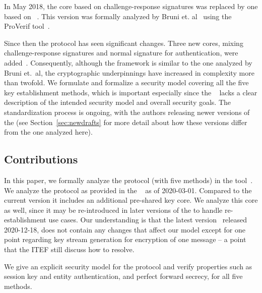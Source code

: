 \documentclass[runningheads, envcountsame, hidelinks, a4paper, draft, x11names]{llncs}
\begin{document}
In May 2018, the core based on challenge-response signatures was replaced by
one based on \mSigma{}~\cite{bruni-analysis-selander-ace-cose-ecdhe-08}.
%
This version was formally analyzed by Bruni et.
al~\cite{DBLP:conf/secsr/BruniJPS18} using the ProVerif
tool~\cite{DBLP:conf/csfw/Blanchet01}.
%

Since then the protocol has seen significant changes.
%
Three new cores, mixing challenge-response signatures and normal signature for
authentication, were added~\cite{our-analysis-selander-lake-edhoc-01}.
%
Consequently, although the framework is similar to the one analyzed by Bruni
et.~al, the cryptographic underpinnings have increased in complexity more than
twofold.
%
We formulate and formalize a security model covering all the five key
establishment methods, which is important especially since the
\mSpec{}~\cite{our-analysis-selander-lake-edhoc-01} lacks a clear description of the intended security model and
overall security goals.
%
The standardization process is ongoing, with the authors releasing newer versions of the \mSpec{} (see Section~\ref{sec:newdrafts} for more detail about how these versions differ from the one analyzed here).
%

%

\subsection{Contributions}
\label{sec:contributions}
In this paper, we formally analyze the \mEdhoc{} protocol (with five methods)
in the \mTamarin{} tool~\cite{DBLP:conf/cav/MeierSCB13}.
%
We analyze the protocol as provided in the
\mSpec{}~\cite{our-analysis-selander-lake-edhoc-01} as of 2020-03-01.
%
Compared to the current version it includes an additional pre-shared key core.
%
We analyze this core as well, since it may be re-introduced in later versions
of the \mSpec{} to handle re-establishment use cases.
%
Our understanding is that the latest version~\cite{latest-ietf-lake-edhoc-03}
released 2020-12-18, does not contain any changes that affect our model except
for one point regarding key stream generation for encryption of one message --
a point that the ITEF still discuss how to resolve.
%

%
%
We give an explicit security model for the protocol and verify
properties such as session key and entity authentication, and perfect forward
secrecy, for all five methods.
\end{document}
